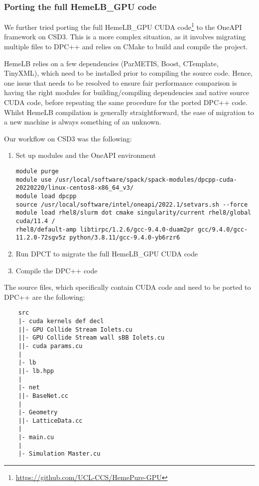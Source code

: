 \documentclass[../main]{subfiles}
\begin{document}
\subsubsection{Porting the full HemeLB\_GPU code}
We further tried porting the full HemeLB\_GPU CUDA code\footnote{\url{https://github.com/UCL-CCS/HemePure-GPU}} to the OneAPI framework on CSD3. This is a more complex situation, as it involves migrating multiple files to DPC++ and relies on CMake to build and compile the project.    

HemeLB relies on a few dependencies (ParMETIS, Boost, CTemplate, TinyXML), which need to be installed prior to compiling the source code. Hence, one issue that needs to be resolved to ensure fair performance comparison is having the right modules for building/compiling dependencies and native source CUDA code, before repeating the same procedure for the ported DPC++ code. Whilst HemeLB compilation is generally straightforward, the ease of migration to a new machine is always something of an unknown.

Our workflow on CSD3 was the following:
\begin{enumerate}
    \item Set up modules and the OneAPI environment
    \begin{verbatim}
module purge
module use /usr/local/software/spack/spack-modules/dpcpp-cuda-20220220/linux-centos8-x86_64_v3/
module load dpcpp
source /usr/local/software/intel/oneapi/2022.1/setvars.sh --force
module load rhel8/slurm dot cmake singularity/current rhel8/global cuda/11.4 /
rhel8/default-amp libtirpc/1.2.6/gcc-9.4.0-duam2pr gcc/9.4.0/gcc-11.2.0-72sgv5z python/3.8.11/gcc-9.4.0-yb6rzr6
    \end{verbatim}
    \item Run DPCT to migrate the full HemeLB\_GPU CUDA code
    \item Compile the DPC++ code 
\end{enumerate}


The source files, which specifically contain CUDA code and need to be ported to DPC++ are the following: 
\begin{verbatim}
    src
    |- cuda kernels def decl
    ||- GPU Collide Stream Iolets.cu
    ||- GPU Collide Stream wall sBB Iolets.cu
    ||- cuda params.cu
    |
    |- lb
    ||- lb.hpp
    |
    |- net
    ||- BaseNet.cc
    |
    |- Geometry
    ||- LatticeData.cc
    |
    |- main.cu
    |
    |- Simulation Master.cu
\end{verbatim}
\end{document}
